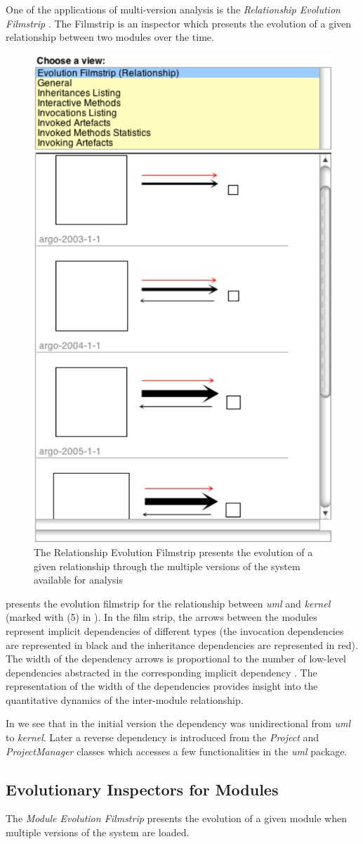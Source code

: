 \documentclass[preprint,12pt]{elsarticle}
\newcommand{\cd}[1]{{\em{#1}}}
\begin{document}
One of the applications of multi-version analysis is the {\em Relationship Evolution Filmstrip} \cite{lungu-relevo}. The Filmstrip is an inspector which presents the evolution of a given relationship between two modules over the time. 


\begin{figure}[ht!]
\begin{center}
\includegraphics[width=0.35\linewidth]{images/Filmstrip}
\caption{The Relationship Evolution Filmstrip presents the evolution of a given relationship through the multiple versions of the system available for analysis}
\end{center}
\end{figure}

 presents the evolution filmstrip for the relationship between \cd{uml} and \cd{kernel} (marked with (5) in ). In the film strip, the arrows between the modules represent implicit dependencies of different types (the invocation dependencies are represented in black and the inheritance dependencies are represented in red). The width of the dependency arrows is proportional to the number of low-level dependencies abstracted in the corresponding implicit dependency \cite{lungu-relevo}. The representation of the width of the dependencies provides insight into the quantitative dynamics of the inter-module relationship.

In  we see that in the initial version the dependency was unidirectional from \cd{uml} to \cd{kernel}. Later a reverse dependency is introduced from the \cd{Project} and \cd{ProjectManager} classes which accesses a few functionalities in the \cd{uml} package.

\subsection {Evolutionary Inspectors for Modules}
The {\em Module Evolution Filmstrip} presents the evolution of a given module when multiple versions of the system are loaded. 
\end{document}
